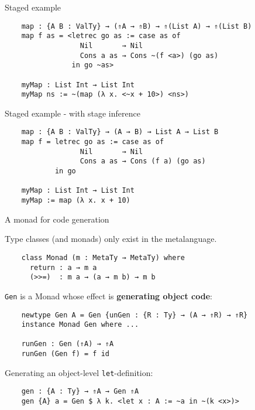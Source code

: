 \documentclass[dvipsnames,aspectratio=169]{beamer}
\newcommand{\ttt}[1]{{\texttt{#1}}}
\theoremstyle{remark}
\begin{document}
\begin{frame}[fragile]{Staged example}

\begin{verbatim}
    map : {A B : ValTy} → (⇑A → ⇑B) → ⇑(List A) → ⇑(List B)
    map f as = <letrec go as := case as of
                  Nil       → Nil
                  Cons a as → Cons ~(f <a>) (go as)
                in go ~as>

    myMap : List Int → List Int
    myMap ns := ~(map (λ x. <~x + 10>) <ns>)
\end{verbatim}

\end{frame}

\begin{frame}[fragile]{Staged example - with stage inference}

\begin{verbatim}
    map : {A B : ValTy} → (A → B) → List A → List B
    map f = letrec go as := case as of
                  Nil       → Nil
                  Cons a as → Cons (f a) (go as)
            in go

    myMap : List Int → List Int
    myMap := map (λ x. x + 10)
\end{verbatim}
\end{frame}

\begin{frame}[fragile]{A monad for code generation}

Type classes (and monads) only exist in the metalanguage.
\begin{verbatim}
    class Monad (m : MetaTy → MetaTy) where
      return : a → m a
      (>>=)  : m a → (a → m b) → m b
\end{verbatim}
\pause
\ttt{Gen} is a Monad whose effect is \textbf{generating object code}:
\begin{verbatim}
    newtype Gen A = Gen {unGen : {R : Ty} → (A → ⇑R) → ⇑R}
    instance Monad Gen where ...

    runGen : Gen (⇑A) → ⇑A
    runGen (Gen f) = f id
\end{verbatim}
\pause
Generating an object-level \ttt{let}-definition:
\begin{verbatim}
    gen : {A : Ty} → ⇑A → Gen ⇑A
    gen {A} a = Gen $ λ k. <let x : A := ~a in ~(k <x>)>
\end{verbatim}

\end{frame}
\end{document}
